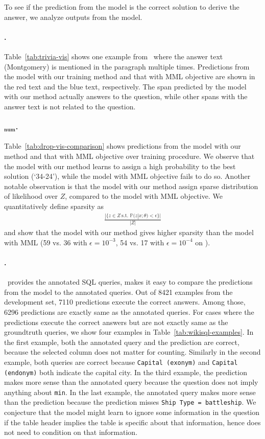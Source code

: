 \documentclass[11pt,a4paper]{article}
\begin{document}
To see if the prediction from the model is the correct solution to derive the answer, we analyze outputs from the model.

\paragraph{\trivia.} Table~\ref{tab:trivia-vis} shows one example from \trivia\  where the answer text (Montgomery) is mentioned in the paragraph multiple times. Predictions from the model with our training method and that with MML objective are shown in the red text and the blue text, respectively. The span predicted by the model with our method actually answers to the question, while other spans with the answer text is not related to the question.

\paragraph{\drop$\boldsymbol{_\text{num}}$.} Table~\ref{tab:drop-vis-comparison} shows predictions from the model with our method and that with MML objective over training procedure. We observe that the model with our method learns to assign a high probability to the best solution (`34-24'), while the model with MML objective fails to do so.
Another notable observation is that the model with our method assign sparse distribution of likelihood over $Z$, compared to the model with MML objective. We quantitatively define sparsity as \begin{align*}\frac{|\{z \in Z~\text{s.t. } \mathbb{P}(z|x; \theta)<\epsilon\}|}{|Z| }\end{align*}\citep{hurley2009comparing} and show that the model with our method gives higher sparsity than the model with MML (59 vs. 36 with $\epsilon=10^{-3}$, 54 vs. 17 with $\epsilon=10^{-4}$ on \drop).

\paragraph{\wikisql.} \wikisql\ provides the annotated SQL queries, makes it easy to compare the predictions from the model to the annotated queries. Out of 8421 examples from the development set, 7110 predictions execute the correct answers. Among those, 6296 predictions are exactly same as the annotated queries. For cases where the predictions execute the correct answers but are not exactly same as the groundtruth queries, we show four examples in Table~\ref{tab:wikisql-examples}. In the first example, both the annotated query and the prediction are correct, because the selected column does not matter for counting. Similarly in the second example, both queries are correct because \texttt{Capital (exonym)} and \texttt{Capital (endonym)} both indicate the capital city. In the third example, the prediction makes more sense than the annotated query because the question does not imply anything  about \texttt{min}. In the last example, the annotated query makes more sense than the prediction because the prediction misses \texttt{Ship Type = battleship}. We conjecture that the model might learn to ignore some information in the question if the table header implies the table is specific about that information, hence does not need to condition on that information. 
\end{document}
